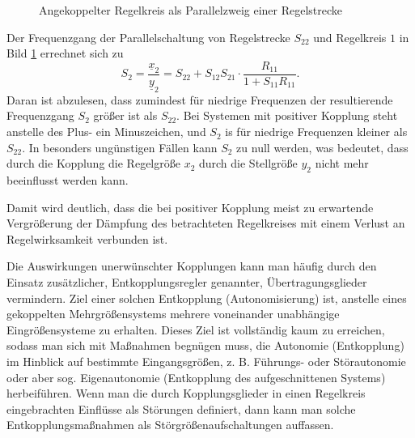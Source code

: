\begin{figure}[ht]
    \centering
    \caption{Angekoppelter Regelkreis als Parallelzweig einer Regelstrecke}
    \label{fig:7-16}
\end{figure}

Der Frequenzgang der Parallelschaltung von Regelstrecke \(S_{22}\) und Regelkreis \(1\) in Bild \ref{fig:7-16} errechnet sich zu
\begin{equation}
    S_2 = \frac{\underline{x}_2}{\underline{y}_2} = S_{22} + S_{12}S_{21} \cdot \frac{R_{11}}{1 + S_{11}R_{11}}.
\end{equation}
Daran ist abzulesen, dass zumindest für niedrige Frequenzen der resultierende Frequenzgang \(S_2\) größer ist als \(S_{22}\).
Bei Systemen mit positiver Kopplung steht anstelle des Plus- ein Minuszeichen, und \(S_2\) is für niedrige Frequenzen kleiner als \(S_{22}\).
In besonders ungünstigen Fällen kann \(S_2\) zu null werden, was bedeutet, dass durch die Kopplung die Regelgröße \(x_2\) durch die Stellgröße \(y_2\) nicht mehr beeinflusst werden kann.

Damit wird deutlich, dass die bei positiver Kopplung meist zu erwartende Vergrößerung der Dämpfung des betrachteten Regelkreises mit einem Verlust an Regelwirksamkeit verbunden ist.

Die Auswirkungen unerwünschter Kopplungen kann man häufig durch den Einsatz zusätzlicher, Entkopplungsregler genannter, Übertragungsglieder vermindern.
Ziel einer solchen Entkopplung (Autonomisierung) ist, anstelle eines gekoppelten Mehrgrößensystems mehrere voneinander unabhängige Eingrößensysteme zu erhalten.
Dieses Ziel ist vollständig kaum zu erreichen, sodass man sich mit Maßnahmen begnügen muss, die Autonomie (Entkopplung) im Hinblick auf bestimmte Eingangsgrößen, z. B. Führungs- oder Störautonomie oder aber sog. Eigenautonomie (Entkopplung des aufgeschnittenen Systems) herbeiführen.
Wenn man die durch Kopplungsglieder in einen Regelkreis eingebrachten Einflüsse als Störungen definiert, dann kann man solche Entkopplungsmaßnahmen als Störgrößenaufschaltungen auffassen.

